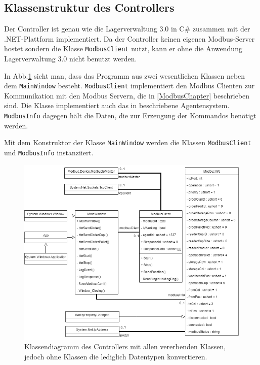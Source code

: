\subsection{Klassenstruktur des Controllers}

Der Controller ist genau wie die Lagerverwaltung 3.0 in C$\#$ zusammen mit der .NET-Plattform implementiert.
Da der Controller keinen eigenen Modbus-Server hostet sondern die Klasse \verb|ModbusClient| nutzt, kann er ohne die 
Anwendung \glqq Lagerverwaltung 3.0\grqq{} nicht benutzt werden.

In Abb.\ref{fig:figure6} sieht man, dass das Programm aus zwei wesentlichen Klassen neben dem \verb|MainWindow| besteht.
\verb|ModbusClient| implementiert den Modbus Clienten zur Kommunikation mit den Modbus Servern, die in \ref{ModbusChapter}
beschrieben sind. Die Klasse implementiert auch das in \cite{LarsKistner2017} beschriebene Agentensystem.
\verb|ModbusInfo| dagegen hält die Daten, die zur Erzeugung der Kommandos benötigt werden.

Mit dem Konstruktor der Klasse \verb|MainWindow| werden die Klassen \verb|ModbusClient| und \verb|ModbusInfo| instanziiert.

\begin{figure}
    \caption[Klassendiagramm des Controllers]
    {\small Klassendiagramm des Controllers mit allen vererbenden Klassen, jedoch ohne Klassen die
    lediglich Datentypen konvertieren.}\label{fig:figure6}
    \includegraphics[width = \textwidth ]{Bilder/C_Klassendiagramm}
    \centering
\end{figure}


